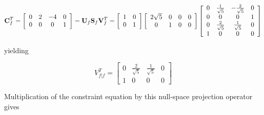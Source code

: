 \documentclass[11pt, titlepage, twoside]{article}
\begin{document}
\begin{MPEquation}[!ht]
\begin{equation}
{\bf{C}}_f^T = \left[ {\begin{array}{*{20}{c}}
0&2&{ - 4}&0\\
0&0&0&1
\end{array}} \right] = {{\bf{U}}_f}{{\bf{S}}_f}{\bf{V}}_f^T = \left[ {\begin{array}{*{20}{c}}
1&0\\
0&1
\end{array}} \right]\left[ {\begin{array}{*{20}{c}}
{2\sqrt 5 }&0&0&0\\
0&1&0&0
\end{array}} \right]\left[ {\begin{array}{*{20}{c}}
0&{\frac{1}{{\sqrt 5 }}}&{ - \frac{2}{{\sqrt 5 }}}&0\\
0&0&0&1\\
0&{\frac{2}{{\sqrt 5 }}}&{\frac{1}{{\sqrt 5 }}}&0\\
1&0&0&0
\end{array}} \right]
\end{equation}
\label{MPEquationElement:63ABD1AD-20F8-42D1-C03C-BE80D9737E0A}
\end{MPEquation}
yielding


\begin{MPEquation}[!ht]
\begin{equation}
V_{\left. f \right|f}^T = \left[ {\begin{array}{*{20}{c}}
0&{\frac{2}{{\sqrt 5 }}}&{\frac{1}{{\sqrt 5 }}}&0\\
1&0&0&0
\end{array}} \right]
\end{equation}
\label{MPEquationElement:35BE27B9-E23B-4EC5-EDF2-4201DDA18872}
\end{MPEquation}
Multiplication of the constraint equation by this null-space projection operator gives
\end{document}
